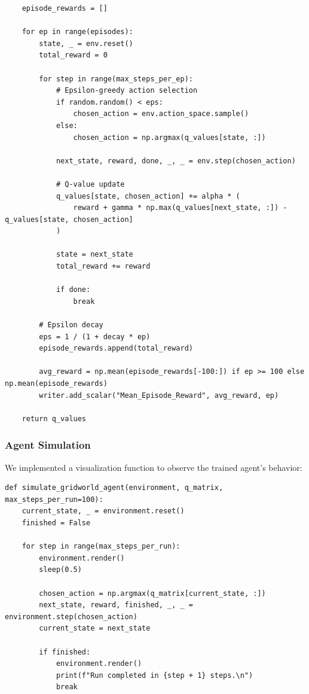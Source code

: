 \documentclass[12pt]{article}
\begin{document}
{{{\begin{verbatim}
    episode_rewards = []
    
    for ep in range(episodes):
        state, _ = env.reset()
        total_reward = 0
    
        for step in range(max_steps_per_ep):
            # Epsilon-greedy action selection
            if random.random() < eps:
                chosen_action = env.action_space.sample()
            else:
                chosen_action = np.argmax(q_values[state, :])
            
            next_state, reward, done, _, _ = env.step(chosen_action)
            
            # Q-value update
            q_values[state, chosen_action] += alpha * (
                reward + gamma * np.max(q_values[next_state, :]) - q_values[state, chosen_action]
            )
    
            state = next_state
            total_reward += reward
    
            if done:
                break
    
        # Epsilon decay
        eps = 1 / (1 + decay * ep)
        episode_rewards.append(total_reward)
        
        avg_reward = np.mean(episode_rewards[-100:]) if ep >= 100 else np.mean(episode_rewards)
        writer.add_scalar("Mean_Episode_Reward", avg_reward, ep)
    
    return q_values
\end{verbatim}

\subsubsection{Agent Simulation}

We implemented a visualization function to observe the trained agent's behavior:

\begin{verbatim}
def simulate_gridworld_agent(environment, q_matrix, max_steps_per_run=100):
    current_state, _ = environment.reset()
    finished = False    
    
    for step in range(max_steps_per_run):            
        environment.render()
        sleep(0.5)  
        
        chosen_action = np.argmax(q_matrix[current_state, :])
        next_state, reward, finished, _, _ = environment.step(chosen_action)
        current_state = next_state

        if finished:
            environment.render()
            print(f"Run completed in {step + 1} steps.\n")
            break
\end{verbatim}

}}}
\end{document}
